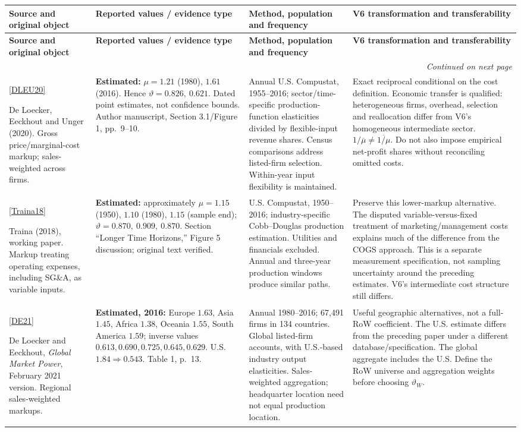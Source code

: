 \documentclass[10pt,a4paper,landscape]{article}
\makeatletter
\newcommand{\src}[1]{\hyperlink{ref:#1}{\textsf{[#1]}}}
\newenvironment{evidence}{%
\fontsize{9.4}{10.9}\selectfont\setlength{\parskip}{2pt}
\begin{longtable}{@{}P{\dimexpr .22\textwidth-7.5pt\relax}P{\dimexpr .24\textwidth-7.5pt\relax}P{\dimexpr .25\textwidth-7.5pt\relax}P{\dimexpr .29\textwidth-7.5pt\relax}@{}}
\toprule\rowcolor{tablehead}\textbf{Source and original object} & \textbf{Reported values / evidence type} & \textbf{Method, population and frequency} & \textbf{V6 transformation and transferability}\\\midrule
\endfirsthead
\toprule\rowcolor{tablehead}\textbf{Source and original object} & \textbf{Reported values / evidence type} & \textbf{Method, population and frequency} & \textbf{V6 transformation and transferability}\\\midrule
\endhead
\midrule\multicolumn{4}{r}{\footnotesize\itshape Continued on next page}\\\endfoot
\bottomrule\endlastfoot
}{\end{longtable}}
\makeatother
\begin{document}
\begin{evidence}
\src{DLEU20}\par De Loecker, Eeckhout and Unger (2020). Gross price/marginal-cost markup; sales-weighted across firms.
& \textbf{Estimated:} $\mu=1.21$ (1980), $1.61$ (2016). Hence $\vartheta=0.826,\ 0.621$. Dated point estimates, not confidence bounds. Author manuscript, Section 3.1/Figure 1, pp.\ 9--10.
& Annual U.S. Compustat, 1955--2016; sector/time-specific production-function elasticities divided by flexible-input revenue shares. Census comparisons address listed-firm selection. Within-year input flexibility is maintained.
& Exact reciprocal conditional on the cost definition. Economic transfer is qualified: heterogeneous firms, overhead, selection and reallocation differ from V6's homogeneous intermediate sector. $1/\overline\mu\ne\overline{1/\mu}$. Do not also impose empirical net-profit shares without reconciling omitted costs.\\[4pt]

\src{Traina18}\par Traina (2018), working paper. Markup treating operating expenses, including SG\&A, as variable inputs.
& \textbf{Estimated:} approximately $\mu=1.15$ (1950), $1.10$ (1980), $1.15$ (sample end); $\vartheta=0.870,\ 0.909,\ 0.870$. Section ``Longer Time Horizons,'' Figure 5 discussion; original text verified.
& U.S. Compustat, 1950--2016; industry-specific Cobb--Douglas production estimation. Utilities and financials excluded. Annual and three-year production windows produce similar paths.
& Preserve this lower-markup alternative. The disputed variable-versus-fixed treatment of marketing/management costs explains much of the difference from the COGS approach. This is a separate measurement specification, not sampling uncertainty around the preceding estimates. V6's intermediate cost structure still differs.\\[4pt]

\src{DE21}\par De Loecker and Eeckhout, \emph{Global Market Power}, February 2021 version. Regional sales-weighted markups.
& \textbf{Estimated, 2016:} Europe $1.63$, Asia $1.45$, Africa $1.38$, Oceania $1.55$, South America $1.59$; inverse values $0.613,0.690,0.725,0.645,0.629$. U.S. $1.84\Rightarrow0.543$. Table 1, p.\ 13.
& Annual 1980--2016; 67,491 firms in 134 countries. Global listed-firm accounts, with U.S.-based industry output elasticities. Sales-weighted aggregation; headquarter location need not equal production location.
& Useful geographic alternatives, not a full-RoW coefficient. The U.S. estimate differs from the preceding paper under a different database/specification. The global aggregate includes the U.S. Define the RoW universe and aggregation weights before choosing $\vartheta_W$.\\[4pt]
\end{evidence}
\end{document}
